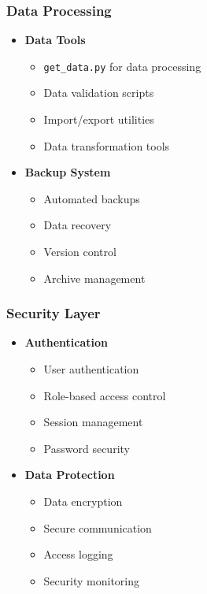 \documentclass[12pt,a4paper]{article}
\begin{document}
\subsubsection{Data Processing}
\begin{itemize}
    \item \textbf{Data Tools}
    \begin{itemize}
        \item \texttt{get\_data.py} for data processing
        \item Data validation scripts
        \item Import/export utilities
        \item Data transformation tools
    \end{itemize}
    
    \item \textbf{Backup System}
    \begin{itemize}
        \item Automated backups
        \item Data recovery
        \item Version control
        \item Archive management
    \end{itemize}
\end{itemize}

\subsubsection{Security Layer}
\begin{itemize}
    \item \textbf{Authentication}
    \begin{itemize}
        \item User authentication
        \item Role-based access control
        \item Session management
        \item Password security
    \end{itemize}
    
    \item \textbf{Data Protection}
    \begin{itemize}
        \item Data encryption
        \item Secure communication
        \item Access logging
        \item Security monitoring
    \end{itemize}
\end{itemize}
\end{document}
